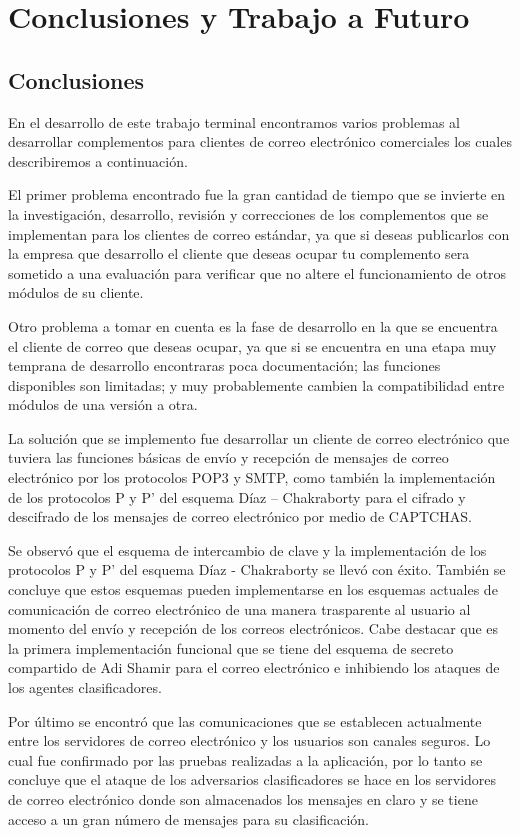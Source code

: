 \chapter{Conclusiones y Trabajo a Futuro}
\section{Conclusiones}

En el desarrollo de este trabajo terminal encontramos varios problemas al desarrollar complementos para clientes de correo electrónico comerciales los cuales describiremos a continuación.

El primer problema encontrado fue la gran cantidad  de tiempo que se invierte en la investigación, desarrollo, revisión y correcciones de los complementos que se implementan para los clientes de correo estándar, ya que si deseas publicarlos con la empresa que desarrollo el cliente que deseas ocupar tu complemento sera sometido a  una evaluación para verificar que no altere el funcionamiento de otros módulos de su cliente.

Otro problema a tomar en cuenta es la fase de desarrollo en la  que se encuentra el cliente de correo que deseas ocupar, ya que si se encuentra en una etapa muy temprana de desarrollo encontraras poca documentación; las funciones disponibles son limitadas; y muy probablemente cambien la compatibilidad entre módulos de una versión a otra. 

La solución que se implemento fue desarrollar un cliente de correo electrónico que tuviera las funciones básicas de envío y recepción de mensajes de correo electrónico por los protocolos POP3 y SMTP, como también la implementación de los protocolos P y P’ del esquema Díaz – Chakraborty para el cifrado y descifrado de los mensajes de correo electrónico por medio de CAPTCHAS.

Se observó que el esquema de intercambio de clave y la implementación de los protocolos P y P' del esquema Díaz - Chakraborty se llevó con éxito. También se concluye que estos esquemas pueden implementarse en los esquemas actuales de comunicación de correo electrónico de una manera trasparente al usuario al momento del envío y recepción de los correos electrónicos. Cabe destacar que es la primera implementación funcional que se tiene del esquema de secreto compartido de Adi Shamir para el correo electrónico e inhibiendo los ataques de los agentes clasificadores.

Por último se encontró que las comunicaciones que se establecen actualmente entre los servidores de correo electrónico y los usuarios son canales seguros. Lo cual fue confirmado por las pruebas realizadas a la aplicación, por lo tanto se concluye que el ataque de los adversarios clasificadores se hace en los servidores de correo electrónico donde son almacenados los mensajes en claro y se tiene acceso a un gran número de mensajes para su clasificación.

